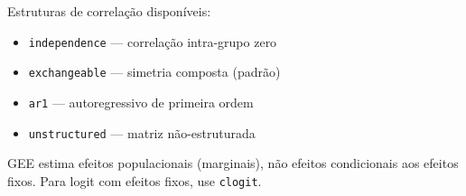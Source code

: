Estruturas de correlação disponíveis:
\begin{itemize}
  \item \texttt{independence} — correlação intra-grupo zero
  \item \texttt{exchangeable} — simetria composta (padrão)
  \item \texttt{ar1} — autoregressivo de primeira ordem
  \item \texttt{unstructured} — matriz não-estruturada
\end{itemize}

\begin{nota}
  GEE estima efeitos populacionais (marginais), não efeitos condicionais
  aos efeitos fixos. Para logit com efeitos fixos, use \texttt{clogit}.
\end{nota}
